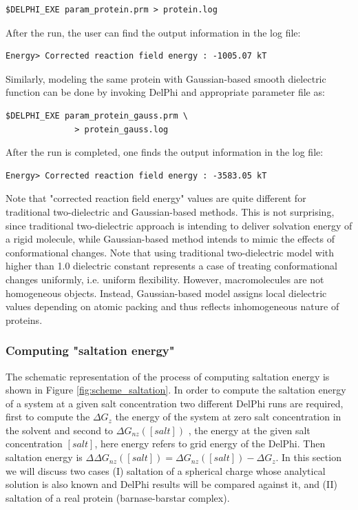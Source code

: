 \documentclass[9pt,tutorial,pubversion]{livecoms}
\begin{document}
\begin{verbatim}
$DELPHI_EXE param_protein.prm > protein.log
\end{verbatim}

After the run, the user can find the output information in the log file: 

\begin{verbatim}
Energy> Corrected reaction field energy : -1005.07 kT
\end{verbatim}

Similarly, modeling the same protein with Gaussian-based smooth dielectric function can be done by invoking DelPhi and appropriate parameter file as:

\begin{verbatim}
$DELPHI_EXE param_protein_gauss.prm \
              > protein_gauss.log
\end{verbatim}

After the run is completed, one finds the output information in the log file: 

\begin{verbatim}
Energy> Corrected reaction field energy : -3583.05 kT
\end{verbatim}

Note that "corrected reaction field energy" values are quite different for traditional two-dielectric and Gaussian-based methods. This is not surprising, since traditional two-dielectric approach is intending to deliver solvation energy of a rigid molecule, while Gaussian-based method intends to mimic the effects of conformational changes. Note that using traditional two-dielectric model with higher than 1.0  dielectric constant represents a case of treating conformational changes uniformly, i.e. uniform flexibility. However, macromolecules are not homogeneous objects. Instead, Gaussian-based model assigns local dielectric values depending on atomic packing and thus reflects inhomogeneous nature of proteins.

\subsubsection{Computing "saltation energy"}

The schematic representation of the process of computing saltation energy is shown in Figure \ref{fig:scheme_saltation}. In order to compute the saltation energy of a system at a given salt concentration two different DelPhi runs are required, first to compute the $ \Delta G_{z} $ the energy of the system at zero salt concentration in the solvent and second to $ \Delta G_{nz}([salt]) $ , the energy at the given salt concentration $[salt]$, here energy refers to grid energy of the DelPhi. Then saltation energy is $ \Delta\Delta G_{nz}([salt]) = \Delta G_{nz}([salt]) - \Delta G_{z}$. In this section we will discuss two cases (I) saltation of a spherical charge whose analytical solution is also known and DelPhi results will be compared against it, and (II) saltation of a real protein (barnase-barstar complex).
\newline
\newline
\end{document}
